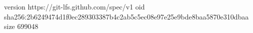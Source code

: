 version https://git-lfs.github.com/spec/v1
oid sha256:2b6249474d1f0ec289303387b4c2ab5c5ec08e97e25e9bde8baa5870e310dbaa
size 699048
